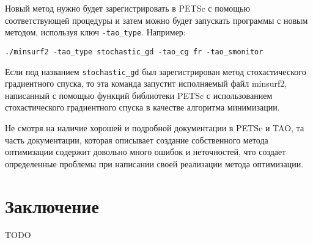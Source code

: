 \documentclass[12pt]{report}
\begin{document}
  Новый метод нужно будет зарегистрировать в PETSc с помощью соответствующей
  процедуры и затем можно будет запускать программы с новым методом, используя
  ключ \verb|-tao_type|. Например:

  \verb|./minsurf2 -tao_type stochastic_gd -tao_cg fr -tao_smonitor|

  Если под названием \verb|stochastic_gd| был зарегистрирован метод стохастического
  градиентного спуска, то эта команда запустит исполняемый файл minsurf2,
  написанный с помощью функций библиотеки PETSc с использованием стохастического
  градиентного спуска в качестве алгоритма минимизации.

  Не смотря на наличие хорошей и подробной документации в PETSc и TAO, та часть
  документации, которая описывает создание собственного метода оптимизации содержит
  довольно много ошибок и неточностей, что создает определенные проблемы при
  написании своей реализации метода оптимизации.

  \chapter*{Заключение}
  {TODO}
\end{document}
